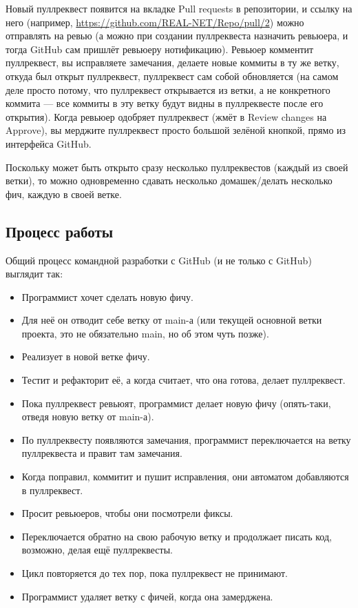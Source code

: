 \documentclass{../../text-style}
\begin{document}
Новый пуллреквест появится на вкладке Pull requests в репозитории, и ссылку на него (например, \url{https://github.com/REAL-NET/Repo/pull/2}) можно отправлять на ревью (а можно при создании пуллреквеста назначить ревьюера, и тогда GitHub сам пришлёт ревьюеру нотификацию). Ревьюер комментит пуллреквест, вы исправляете замечания, делаете новые коммиты в ту же ветку, откуда был открыт пуллреквест, пуллреквест сам собой обновляется (на самом деле просто потому, что пуллреквест открывается из ветки, а не конкретного коммита --- все коммиты в эту ветку будут видны в пуллреквесте после его открытия). Когда ревьюер одобряет пуллреквест (жмёт в Review changes на Approve), вы мерджите пуллреквест просто большой зелёной кнопкой, прямо из интерфейса GitHub.

Поскольку может быть открыто сразу несколько пуллреквестов (каждый из своей ветки), то можно одновременно сдавать несколько домашек/делать несколько фич, каждую в своей ветке.

\subsection{Процесс работы}

Общий процесс командной разработки с GitHub (и не только с GitHub) выглядит так:

\begin{itemize}
    \item Программист хочет сделать новую фичу.
    \item Для неё он отводит себе ветку от main-а (или текущей основной ветки проекта, это не обязательно main, но об этом чуть позже).
    \item Реализует в новой ветке фичу.
    \item Тестит и рефакторит её, а когда считает, что она готова, делает пуллреквест.
    \item Пока пуллреквест ревьюят, программист делает новую фичу (опять-таки, отведя новую ветку от main-а).
    \item По пуллреквесту появляются замечания, программист переключается на ветку пуллреквеста и правит там замечания.
    \item Когда поправил, коммитит и пушит исправления, они автоматом добавляются в пуллреквест.
    \item Просит ревьюеров, чтобы они посмотрели фиксы.
    \item Переключается обратно на свою рабочую ветку и продолжает писать код, возможно, делая ещё пуллреквесты.
    \item Цикл повторяется до тех пор, пока пуллреквест не принимают.
    \item Программист удаляет ветку с фичей, когда она замерджена.
\end{itemize}
\end{document}
